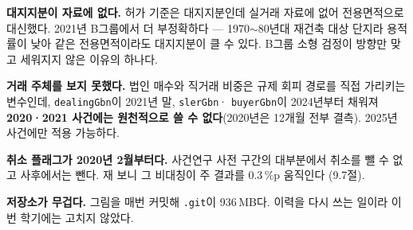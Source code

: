 \textbf{대지지분이 자료에 없다.} 허가 기준은 대지지분인데 실거래 자료에 없어
전용면적으로 대신했다. 2021년 B그룹에서 더 부정확하다 --- 1970$\sim$80년대 재건축
대상 단지라 용적률이 낮아 같은 전용면적이라도 대지지분이 클 수 있다. B그룹 소형
검정이 방향만 맞고 세워지지 않은 이유의 하나다.

\textbf{거래 주체를 보지 못했다.} 법인 매수와 직거래 비중은 규제 회피 경로를
직접 가리키는 변수인데, \texttt{dealingGbn}이 2021년 말, \texttt{slerGbn}·
\texttt{buyerGbn}이 2024년부터 채워져 \textbf{2020·2021 사건에는 원천적으로 쓸 수
없다}(2020년은 12개월 전부 결측). 2025년 사건에만 적용 가능하다.

\textbf{취소 플래그가 2020년 2월부터다.} 사건연구 사전 구간의 대부분에서 취소를
뺄 수 없고 사후에서는 뺀다. 재 보니 그 비대칭이 주 결과를 0.3\,\%p 움직인다
(9.7절).

\textbf{저장소가 무겁다.} 그림을 매번 커밋해 \texttt{.git}이 936\,MB다. 이력을
다시 쓰는 일이라 이번 학기에는 고치지 않았다.
